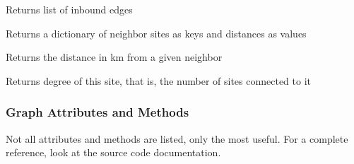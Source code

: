 \documentclass[a4paper,10pt,english]{sphinxmanual}
\begin{document}
\begin{fulllineitems}
\begin{fulllineitems}
\label{scripting:Site.getInEdges}
Returns list of inbound edges

\end{fulllineitems}


\begin{fulllineitems}
\label{scripting:Site.getNeighbors}
Returns a dictionary of neighbor sites as keys and distances as values

\end{fulllineitems}


\begin{fulllineitems}
\label{scripting:Site.getDistanceFromNeighbor}
Returns the distance in km from a given neighbor

\end{fulllineitems}


\begin{fulllineitems}
\label{scripting:Site.getDegree}
Returns degree of this site, that is, the number of sites connected to it

\end{fulllineitems}


\end{fulllineitems}



\subsubsection{Graph Attributes and Methods}
\label{scripting:graph-attributes-and-methods}
Not all attributes and methods are listed, only the most useful. For a complete reference, look at the source code documentation.
\end{document}
